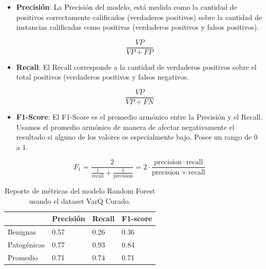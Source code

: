 \begin{itemize}
    \item \textbf{Precisión}: La Precisión del modelo, está medida como la cantidad de positivos correctamente calificados (verdaderos positivos) sobre la cantidad de instancias calificadas como positivas (verdaderos positivos y falsos positivos).
    
    \begin{equation*}
        \frac{VP}{VP + FP}
    \end{equation*}
    
\pagebreak
    \item \textbf{Recall}: El Recall corresponde a la cantidad de verdaderos positivos sobre el total positivos (verdaderos positivos y falsos negativos.
    
    \begin{equation*}
        \frac{VP}{VP + FN}
    \end{equation*}
    
    \item \textbf{F1-Score}: El F1-Score es el promedio armónico entre la Precisión y el Recall. Usamos el promedio armónico de manera de afectar negativamente el resultado si alguno de los valores es especialmente bajo. Posee un rango de 0 a 1. 
    
    \begin{equation*}
        F_1 = \frac{2}{\tfrac{1}{\mathrm{recall}} + \tfrac{1}{\mathrm{precision}}} = 2 \cdot \frac{\mathrm{precision} \cdot \mathrm{recall}}{\mathrm{precision} + \mathrm{recall}}
    \end{equation*}
    
\end{itemize}

\begin{table}[H]
\centering
\begin{tabular}{|l|l|l|l|}
\hline
              & Precisión & Recall & F1-score \\ \hline
Benignas      & 0.57      & 0.26   & 0.36     \\ \hline
Patogénicas   & 0.77      & 0.93   & 0.84     \\ \hline
Promedio      & 0.71      & 0.74   & 0.71     \\ \hline
\end{tabular}
\caption{Reporte de métricas del modelo Random Forest usando el dataset VarQ Curado.}

\label{tab:metrics_varq}
\end{table}


